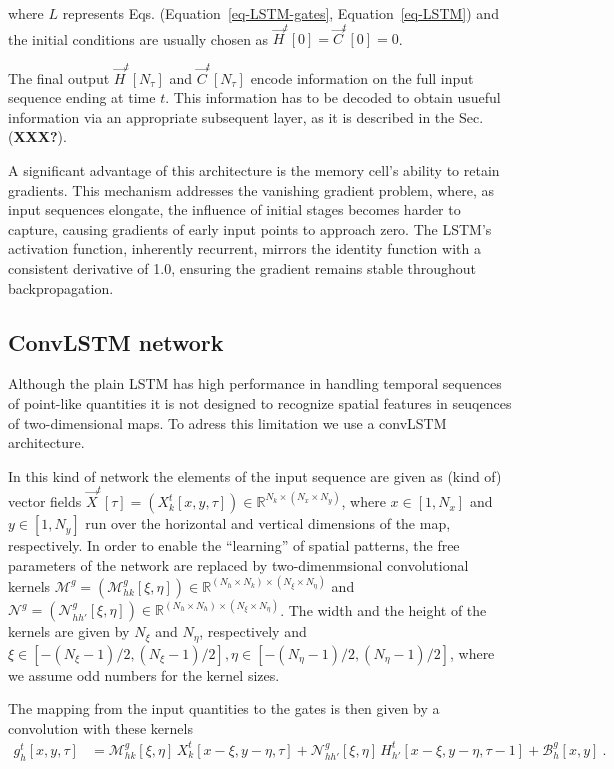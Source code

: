 \documentclass[
]{agujournal2019}
\begin{document}
where \(L\) represents Eqs. (Equation~\ref{eq-LSTM-gates},
Equation~\ref{eq-LSTM}) and the initial conditions are usually chosen as
\(\vec{H}^t[0]=\vec{C}^t[0]=0\).

The final output \(\vec{H}^t[N_\tau]\) and \(\vec{C}^t[N_\tau]\) encode
information on the full input sequence ending at time \(t\). This
information has to be decoded to obtain usueful information via an
appropriate subsequent layer, as it is described in the Sec.
(\textbf{XXX?}).

A significant advantage of this architecture is the memory cell's
ability to retain gradients. This mechanism addresses the vanishing
gradient problem, where, as input sequences elongate, the influence of
initial stages becomes harder to capture, causing gradients of early
input points to approach zero. The LSTM's activation function,
inherently recurrent, mirrors the identity function with a consistent
derivative of 1.0, ensuring the gradient remains stable throughout
backpropagation.

\subsection{ConvLSTM network}\label{convlstm-network}

Although the plain LSTM has high performance in handling temporal
sequences of point-like quantities it is not designed to recognize
spatial features in seuqences of two-dimensional maps. To adress this
limitation we use a convLSTM architecture.

In this kind of network the elements of the input sequence are given as
(kind of) vector fields
\(\vec{X}^t[\tau] = (X^t_k[x,y,\tau]) \in \mathbb{R}^{N_k \times (N_x \times N_y)}\),
where \(x\in[1, N_x]\) and \(y \in [1, N_y]\) run over the horizontal
and vertical dimensions of the map, respectively. In order to enable the
``learning'' of spatial patterns, the free parameters of the network are
replaced by two-dimenmsional convolutional kernels
\(\pmb{\mathcal{M}}^{g} = (\mathcal{M}^{g}_{hk}[\xi, \eta]) \in \mathbb{R}^{(N_h \times N_k)\times (N_\xi \times N_\eta)}\)
and
\(\pmb{\mathcal{N}}^{g} = (\mathcal{N}^{g}_{hh'}[\xi, \eta]) \in \mathbb{R}^{(N_h \times N_h)\times (N_\xi \times N_\eta)}\).
The width and the height of the kernels are given by \(N_\xi\) and
\(N_\eta\), respectively and
\(\xi\in [-(N_\xi-1)/2,(N_\xi-1)/2], \eta\in [-(N_\eta-1)/2,(N_\eta-1)/2]\),
where we assume odd numbers for the kernel sizes.

The mapping from the input quantities to the gates is then given by a
convolution with these kernels \[
\begin{aligned}
g^t_h[x,y,\tau] & =  \mathcal{M}^{g}_{hk} [\xi,\eta]\, X^t_k[x-\xi, y-\eta, \tau]  +  \mathcal{N}^{g}_{hh'}[\xi,\eta] \, H^t_{h'}[x-\xi, y-\eta, \tau-1] + \mathcal{B}^g_{h}[x,y] \ .
\end{aligned}
\]
\end{document}
